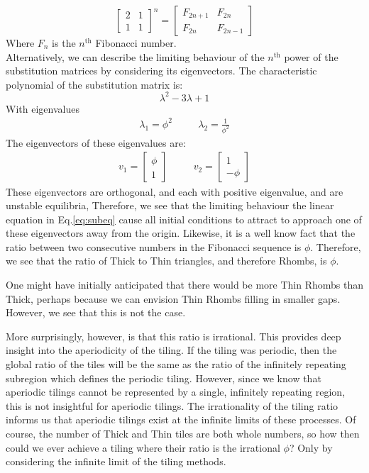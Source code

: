 \documentclass[
  oneside,
  11pt, a4paper,
  footinclude=true,
  headinclude=true,
  cleardoublepage=empty
]{scrbook}
\begin{document}
\begin{equation}
\begin{bmatrix}
2 & 1 \\
1 & 1
\end{bmatrix}^n= 
\begin{bmatrix}
F_{2n+1} & F_{2n} \\
F_{2n} & F_{2n-1}
\end{bmatrix}
\end{equation}
Where $F_n$ is the $n^{\text{th}}$ Fibonacci number.\\
Alternatively, we can describe the limiting behaviour of the $n^{\text{th}}$ power of the substitution matrices by considering its eigenvectors. The characteristic polynomial of the substitution matrix is:
\begin{equation}
\lambda^2-3\lambda+1
\end{equation}
With eigenvalues
\begin{align}
\lambda_1=\phi^2 &\quad
&\lambda_2=\frac{1}{\phi^2}
\end{align}
The eigenvectors of these eigenvalues are:
\begin{align}
v_1= \begin{bmatrix}
\phi \\
1
\end{bmatrix}
&\quad&
v_2= \begin{bmatrix}
1 \\
-\phi
\end{bmatrix}
\end{align}
These eigenvectors are orthogonal, and each with positive eigenvalue, and are unstable equilibria, Therefore, we see that the limiting behaviour the linear equation in Eq.\ref{eq:subeq} cause all initial conditions to attract to approach one of these eigenvectors away from the origin. Likewise, it is a well know fact that the ratio between two consecutive numbers in the Fibonacci sequence is $\phi$. Therefore, we see that the ratio of Thick to Thin triangles, and therefore Rhombs, is $\phi$.

One might have initially anticipated that there would be more Thin Rhombs than Thick, perhaps because we can envision Thin Rhombs filling in smaller gaps. However, we see that this is not the case.

More surprisingly, however, is that this ratio is irrational. This provides deep insight into the aperiodicity of the tiling. If the tiling was periodic, then the global ratio of the tiles will be the same as the ratio of the infinitely repeating subregion which defines the periodic tiling. However, since we know that aperiodic tilings cannot be represented by a single, infinitely repeating region, this is not insightful for aperiodic tilings. The irrationality of the tiling ratio informs us that aperiodic tilings exist at the infinite limits of these processes. Of course, the number of Thick and Thin tiles are both whole numbers, so how then could we ever achieve a tiling where their ratio is the irrational $\phi$? Only by considering the infinite limit of the tiling methods.


    
\end{document}
